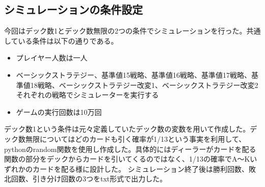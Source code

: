 \subsection{シミュレーションの条件設定}
今回はデック数1とデック数無限の2つの条件でシミュレーションを行った。共通している条件は以下の通りである。
\begin{itemize}
\item プレイヤー人数は一人
\item ベーシックストラテジー、基準値15戦略、基準値16戦略、基準値17戦略、基準値18戦略、ベーシックストラテジー改変1、ベーシックストラテジー改変2それぞれの戦略でシミュレーターを実行する
\item ゲームの実行回数は10万回
\end{itemize}

デック数1という条件は元々定義していたデック数の変数を用いて作成した。デック数無限についてはどのカードも引く確率が1/13という事実を利用して、pythonのrandom関数を使用し作成した。具体的にはディーラーがカードを配る関数の部分をデックからカードを引いてくるのではなく、1/13の確率でA～Kいずれかのカードを配る様に設計した。
シミュレーション終了後は勝利回数、敗北回数、引き分け回数の3つをtxt形式で出力した。
